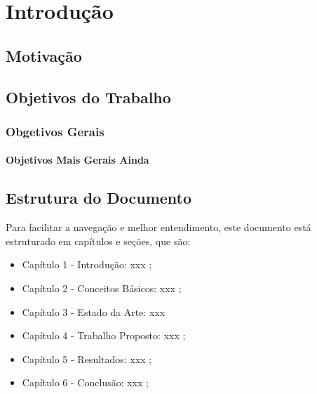 \chapter{Introdução}

\lipsum


\section{Motivação}
\lipsum


\section{Objetivos do Trabalho}

\lipsum

\subsection{Obgetivos Gerais}
\lipsum

\subsubsection{Objetivos Mais Gerais Ainda}
\lipsum

\section{Estrutura do Documento}

Para facilitar a navegação e melhor entendimento, este documento está
estruturado em capítulos e seções, que são:
\begin{itemize}
\item {Capítulo 1 - Introdução}: xxx \cite{Yu:2004:ESG:1015090.1015207};
\item {Capítulo 2 - Conceitos Básicos}: xxx \cite{Cormen:2009};
\item {Capítulo 3 - Estado da Arte}: xxx \cite{Weicker:1984:DSS:358274.358283}
\item {Capítulo 4 - Trabalho Propost}o: xxx \cite{IEEE_802_11:6178212};
\item {Capítulo 5 - Resultados}: xxx \cite{Linux:402081};
\item {Capítulo 6 - Conclusão}: xxx \cite{SBC:2012};
\end{itemize}